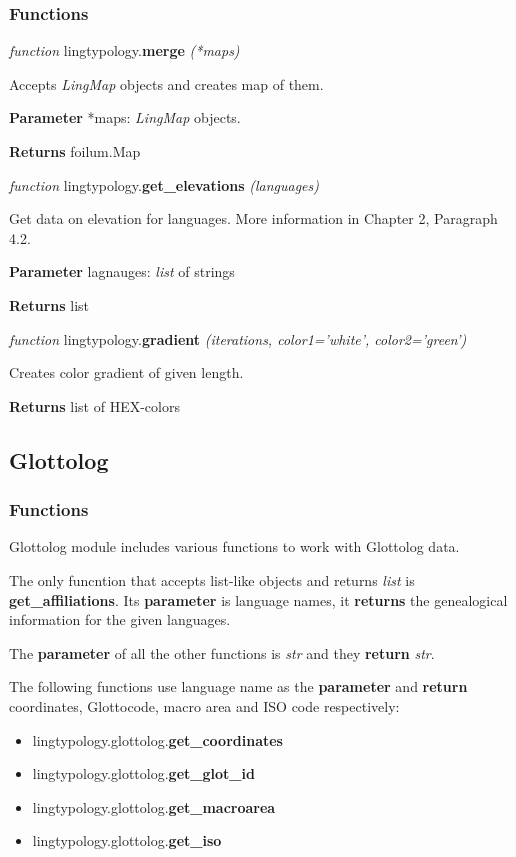 \documentclass[a4paper,12pt]{article}
\begin{document}
\subsubsection{Functions}

\textit{function} lingtypology.\textbf{merge} \textit{(*maps)}

Accepts \textit{LingMap} objects and creates map of them.

\textbf{Parameter} *maps: \textit{LingMap} objects.

\textbf{Returns} foilum.Map
\medskip

\textit{function} lingtypology.\textbf{get\_elevations} \textit{(languages)}

Get data on elevation for languages. More information in Chapter 2, Paragraph 4.2.

\textbf{Parameter} lagnauges: \textit{list} of strings

\textbf{Returns} list
\medskip

\textit{function} lingtypology.\textbf{gradient} \textit{(iterations, color1='white', color2='green')}

Creates color gradient of given length.

\textbf{Returns} list of HEX-colors

\subsection{Glottolog}

\subsubsection{Functions}
Glottolog module includes various functions to work with Glottolog data.

The only funcntion that accepts list-like objects and returns \textit{list} is \textbf{get\_affiliations}. Its \textbf{parameter} is language names, it \textbf{returns} the genealogical information for the given languages.

The \textbf{parameter} of all the other functions is \textit{str} and they \textbf{return} \textit{str}.

The following functions use language name as the \textbf{parameter} and \textbf{return} coordinates, Glottocode, macro area and ISO code respectively:
\begin{itemize}
 \item lingtypology.glottolog.\textbf{get\_coordinates}
 \item lingtypology.glottolog.\textbf{get\_glot\_id}
 \item lingtypology.glottolog.\textbf{get\_macroarea}
 \item lingtypology.glottolog.\textbf{get\_iso}
\end{itemize}
\end{document}
